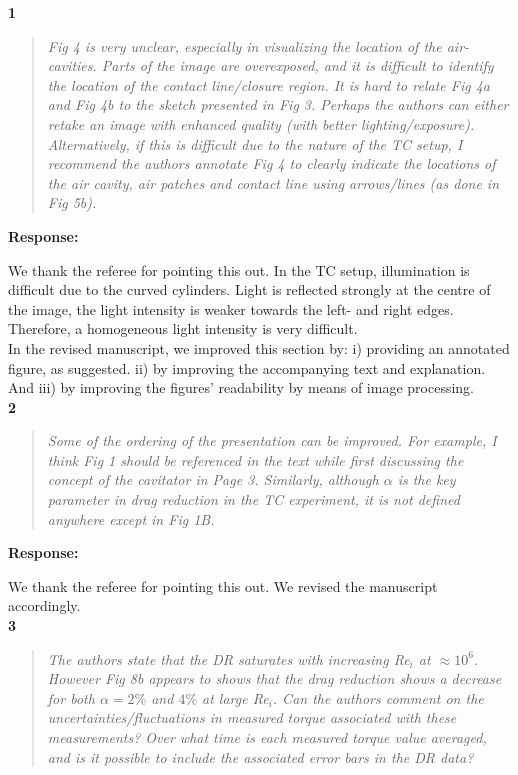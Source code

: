 \documentclass[10pt]{article}
\newcommand{\strong}[1]{\textbf{#1}}
\newcommand{\question}[1]{\begin{quote} \emph{#1}  \end{quote} }
\begin{document}
\noindent \strong{1}

\question{Fig 4 is very unclear, especially in visualizing the location of the air-cavities. Parts of the image are overexposed, and it is difficult to identify the location of the contact line/closure region. It is hard to relate Fig 4a and Fig 4b to the sketch presented in Fig 3. Perhaps the authors can either retake an image with enhanced quality (with better lighting/exposure). Alternatively, if this is difficult due to the nature of the TC setup, I recommend the authors annotate Fig 4 to clearly indicate the locations of the air cavity, air patches and contact line using arrows/lines (as done in Fig 5b). }

\noindent \strong{Response:} 

\noindent We thank the referee for pointing this out. In the TC setup, illumination is difficult due to the curved cylinders. Light is reflected strongly at the centre of the image, the light intensity is weaker towards the left- and right edges. Therefore, a homogeneous light intensity is very difficult. \\
In the revised manuscript, we improved this section by: i) providing an annotated figure, as suggested. ii) by improving the accompanying text and explanation. And iii) by improving the figures' readability by means of image processing. \\
	 
\noindent \strong{2}

\question{Some of the ordering of the presentation can be improved. For example, I think Fig 1 should be referenced in the text while first discussing the concept of the cavitator in Page 3. Similarly, although $\alpha$ is the key parameter in drag reduction in the TC experiment, it is not defined anywhere except in Fig 1B.  }

\noindent \strong{Response:} 

\noindent We thank the referee for pointing this out. We revised the manuscript accordingly.\\

\noindent \strong{3}

\question{The authors state that the DR saturates with increasing Re$_i$ at $\approx 10^6$. However Fig 8b appears to shows that the drag reduction shows a decrease for both $\alpha=2\%$ and $4\%$ at large Re$_i$. Can the authors comment on the uncertainties/fluctuations in measured torque associated with these measurements? Over what time is each measured torque value averaged, and is it possible to include the associated error bars in the DR data? }
\end{document}
